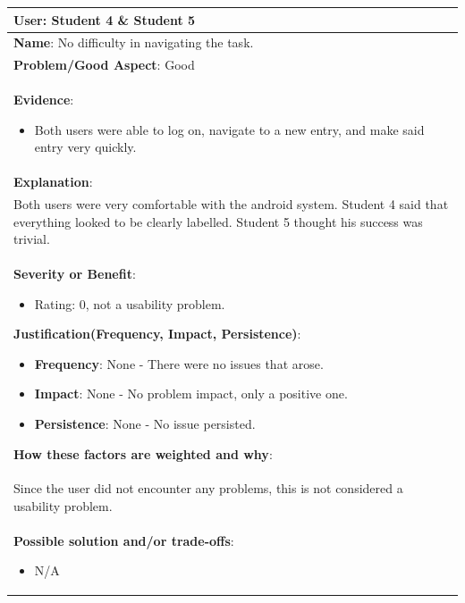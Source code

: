 \documentclass[pdftex,12pt,a4paper]{report}
\begin{document}
\begin{center}
	\begin{tabular}{|p{\textwidth}|}
	\hline
	\textbf{User}: Student 4 \& Student 5\\
	\hline
	\textbf{Name}: No difficulty in navigating the task.\\
	\hline
	\textbf{Problem/Good Aspect}: Good\\
	\hline
	\textbf{Evidence}:
	\begin{itemize}
	\item{Both users were able to log on, navigate to a new entry, and make said entry very quickly.}
	\end{itemize}\\
	\hline
	\textbf{Explanation}:\\
	Both users were very comfortable with the android system. Student 4 said that everything looked to be clearly labelled. Student 5 thought his success was trivial.\\
	\hline
\textbf{Severity or Benefit}:
	\begin{itemize}
	\item{Rating: 0, not a usability problem.}
	\end{itemize}
	\textbf{Justification(Frequency, Impact, Persistence)}:
	\begin{itemize}
	\item{\textbf{Frequency}:} None - There were no issues that arose.
	\item{\textbf{Impact}:} None - No problem impact, only a positive one.
	\item{\textbf{Persistence}:} None - No issue persisted.
	\end{itemize}
	\textbf{How these factors are weighted and why}:\\
	Since the user did not encounter any problems, this is not considered a usability problem.\\
	\hline
	\textbf{Possible solution and/or trade-offs}:
	\begin{itemize}
	\item{N/A}
	\end{itemize}\\
	\hline
	\end{tabular}
\end{center}
\end{document}
